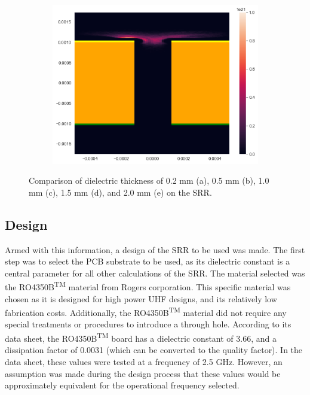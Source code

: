 \begin{figure}
\begin{subfigure}[b]{0.475\textwidth}
        \centering 
        \includegraphics[width=\textwidth]{chapter_4/figures/SRR_dielectric_5.png}
        \caption{}    
        \label{fig:SRR_dielectric_2.0mm}
    \end{subfigure}
    \caption[]
    {\small Comparison of dielectric thickness of 0.2 mm (a), 0.5 mm (b), 1.0 mm (c), 1.5 mm (d), and 2.0 mm (e) on the SRR.} 
    \label{fig:SRR_dielectric_comparison_stabilise}
\end{figure}

\subsection{Design}

Armed with this information, a design of the SRR to be used was made. The first step was to select the PCB substrate to be used, as its dielectric constant is a central parameter for all other calculations of the SRR. The material selected was the RO4350B\textsuperscript{TM} material from Rogers corporation. This specific material was chosen as it is designed for high power UHF designs, and its relatively low fabrication costs. Additionally, the RO4350B\textsuperscript{TM} material did not require any special treatments or procedures to introduce a through hole. According to its data sheet, the RO4350B\textsuperscript{TM} board has a dielectric constant of 3.66, and a dissipation factor of 0.0031 (which can be converted to the quality factor). In the data sheet, these values were tested at a frequency of 2.5 GHz. However, an assumption was made during the design process that these values would be approximately equivalent for the operational frequency selected.  

